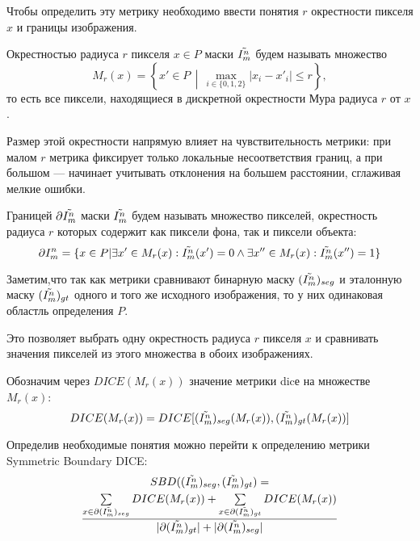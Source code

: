Чтобы определить эту метрику необходимо ввести понятия \(r\) окрестности пикселя \(x\) и границы изображения.

Окрестностью радиуса \(r\) пикселя \(x \in P\) маски \(\tilde{I^n_m}\) будем называть множество
\begin{equation}\label{eq:neighborhood}
    M_r(x) = \left\{ x' \in P \,\middle|\, \max_{i \in \{0,1,2\}} |x_i - x'_i| \leq r \right\},
\end{equation}
то есть все пиксели, находящиеся в дискретной окрестности Мура радиуса \(r\) от \(x\).

Размер этой окрестности напрямую влияет на чувствительность метрики: при малом  \(r\) метрика фиксирует только локальные несоответствия границ, а при большом — начинает учитывать отклонения на большем расстоянии, сглаживая мелкие ошибки.

Границей \(\partial \tilde{I^n_m} \) маски \(\tilde{I^n_m} \) будем называть множество пикселей, окрестность радиуса \(r\) которых содержит как пиксели фона, так и пиксели объекта:
\begin{equation}\label{eq:boundary}
    \partial I^n_m = \{ x \in P | \exists x' \in M_r(x) : \tilde{I^n_m}(x') = 0 \land  \exists x'' \in M_r(x) : \tilde{I^n_m}(x'') = 1 \}
\end{equation}

Заметим,что так как метрики сравнивают бинарную маску \((\tilde{I^n_m})_{seg}\) и эталонную маску \((\tilde{I^n_m})_{gt}\) одного и того же исходного изображения, то у них одинаковая областль определения \(P\). 

Это позволяет выбрать одну окрестность радиуса \(r\) пикселя \(x\) и сравнивать значения пикселей из этого множества в обоих изображениях.

Обозначим через \(DICE(M_r(x))\) значение метрики dicе на множестве \(M_r(x)\): 
\begin{equation}
    DICE(M_r(x)) = DICE[(\tilde{I^n_m})_{seg}(M_r(x)), (\tilde{I^n_m})_{gt}(M_r(x))]
\end{equation}

Определив необходимые понятия можно перейти к определению метрики Symmetric Boundary DICE:
\begin{multline}\label{eq:SBD}
    SBD((\tilde{I^n_m})_{seg}, (\tilde{I^n_m})_{gt}) = \\
    \frac{
        \sum\limits_{x \in \partial (\tilde{I^n_m})_{seg}} DICE(M_r(x)) 
        + \sum\limits_{x \in \partial (\tilde{I^n_m})_{gt}} DICE(M_r(x))
    }{
        |\partial (\tilde{I^n_m})_{gt}| + |\partial (\tilde{I^n_m})_{seg}|
    }
\end{multline}

